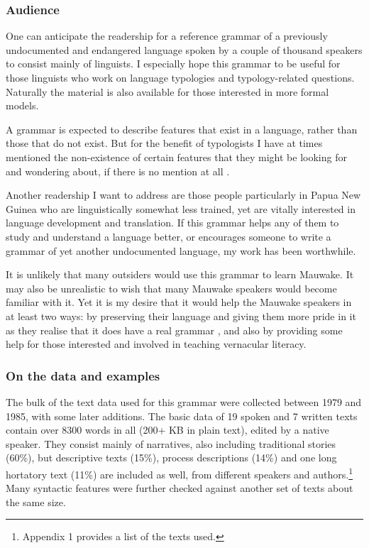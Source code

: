 \subsubsection{ Audience} 
\hypertarget{RefHeading18381935131865}{}One can anticipate the readership for a reference grammar of a previously undocumented and endangered language spoken by a couple of thousand speakers to consist mainly of linguists.  I especially hope this grammar to be useful for those linguists who work on language typologies and typology-related questions. Naturally the material is also available for those interested in more formal models.

A grammar is expected to describe features that exist in a language, rather than those that do not exist. But for the benefit of typologists I have at times mentioned the non-existence of certain features that they might be looking for and wondering about, if there is no mention at all \citep{Cristofaro2006}. 

Another readership I want to address are those people particularly in Papua New Guinea who are linguistically somewhat less trained, yet are vitally interested in language development and translation.  If this grammar helps any of them to study and understand a language better, or encourages someone to write a grammar of yet another undocumented language, my work has been worthwhile.

It is unlikely that many outsiders would use this grammar to learn Mauwake.  It may also be unrealistic to wish that many Mauwake speakers would become familiar with it. Yet it is my desire that it would help the Mauwake speakers in at least two ways: by preserving their language and giving them more pride in it as they realise that it does have a real grammar \citep[255]{Kadanya2006}, and also by providing some help for those interested and involved in teaching vernacular literacy.

\subsubsection{On the data and examples} 
\hypertarget{RefHeading18401935131865}{}The bulk of the text data used for this grammar were collected between 1979 and 1985, with some later additions. The basic data of 19 spoken and 7 written texts contain over 8300 words in all (200+ KB in plain text), edited by a native speaker. They consist mainly of narratives, also including traditional stories (60\%), but descriptive texts (15\%), process descriptions (14\%) and one long hortatory text (11\%) are included as well, from different speakers and authors.\footnote{Appendix 1 provides a list of the texts used.} Many syntactic features were further checked against another set of texts about the same size. 

